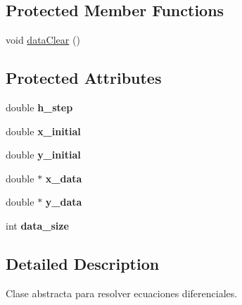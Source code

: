 \subsection*{Protected Member Functions}
\begin{DoxyCompactItemize}
\item 
void \hyperlink{classEulerSolver_af16a63dfc42f446e7fa312178707363d}{data\+Clear} ()
\end{DoxyCompactItemize}
\subsection*{Protected Attributes}
\begin{DoxyCompactItemize}
\item 
double {\bfseries h\+\_\+step}\hypertarget{classEulerSolver_a6bedf0a630f318074ade4745072260d4}{}\label{classEulerSolver_a6bedf0a630f318074ade4745072260d4}

\item 
double {\bfseries x\+\_\+initial}\hypertarget{classEulerSolver_ad2e74ab2d0c6ca0a85fe5e8abc45a71c}{}\label{classEulerSolver_ad2e74ab2d0c6ca0a85fe5e8abc45a71c}

\item 
double {\bfseries y\+\_\+initial}\hypertarget{classEulerSolver_aca7c9e78980015ca53b61db34c76e989}{}\label{classEulerSolver_aca7c9e78980015ca53b61db34c76e989}

\item 
double $\ast$ {\bfseries x\+\_\+data}\hypertarget{classEulerSolver_ae1b041e905fd619a42ca60125d7b8fb7}{}\label{classEulerSolver_ae1b041e905fd619a42ca60125d7b8fb7}

\item 
double $\ast$ {\bfseries y\+\_\+data}\hypertarget{classEulerSolver_a125cb8e3247bbb4cdbfdcf84b7164ed7}{}\label{classEulerSolver_a125cb8e3247bbb4cdbfdcf84b7164ed7}

\item 
int {\bfseries data\+\_\+size}\hypertarget{classEulerSolver_a4eef7bcc8af3b1ca05b197a6ef8d7739}{}\label{classEulerSolver_a4eef7bcc8af3b1ca05b197a6ef8d7739}

\end{DoxyCompactItemize}


\subsection{Detailed Description}
Clase abstracta para resolver ecuaciones diferenciales. 

